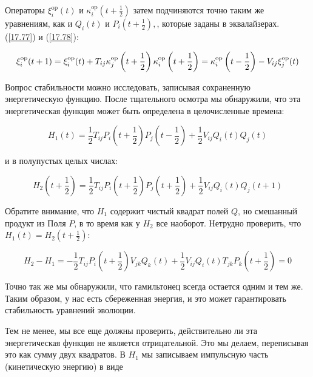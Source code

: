 \documentclass[main.tex]{subfiles}
\begin{document}
Операторы $\xi_{i}^{\mathrm{op}}(t)$ и $\kappa_{i}^{\mathrm{op}}\left(t+\frac{1}{2}\right)$ затем подчиняются точно таким же уравнениям, как и $Q_{i}(t)$ и $P_{i}\left(t+\frac{1}{2}\right),$, которые заданы в эквалайзерах. (\ref{17.77}) и (\ref{17.78}):

\begin{equation}\label{17.83}
\xi_{i}^{\mathrm{op}}(t+1)=\xi_{i}^{\mathrm{op}}(t)+T_{i j} \kappa_{j}^{\mathrm{op}}\left(t+\frac{1}{2}\right)\\
\kappa_{i}^{\mathrm{op}}\left(t+\frac{1}{2}\right)=\kappa_{i}^{\mathrm{op}}\left(t-\frac{1}{2}\right)-V_{i j} \xi_{j}^{\mathrm{op}}(t)
\end{equation}

Вопрос стабильности можно исследовать, записывая сохраненную энергетическую функцию. После тщательного осмотра мы обнаружили, что эта энергетическая функция может быть определена в целочисленные времена:

\begin{equation}\label{17.84}
H_{1}(t)=\frac{1}{2} T_{i j} P_{i}\left(t+\frac{1}{2}\right) P_{j}\left(t-\frac{1}{2}\right)+\frac{1}{2} V_{i j} Q_{i}(t) Q_{j}(t)
\end{equation}

и в полупустых целых числах:

\begin{equation}\label{17.85}
H_{2}\left(t+\frac{1}{2}\right)=\frac{1}{2} T_{i j} P_{i}\left(t+\frac{1}{2}\right) P_{j}\left(t+\frac{1}{2}\right)+\frac{1}{2} V_{i j} Q_{i}(t) Q_{j}(t+1)
\end{equation}

Обратите внимание, что $H_{1}$ содержит чистый квадрат полей $Q$, но смешанный продукт из
Поля $P$, в то время как у $H_{2}$ все наоборот. Нетрудно проверить, что $H_{1}(t)=H_{2}\left(t+\frac{1}{2}\right):$

\begin{equation}\label{17.86}
H_{2}-H_{1}=-\frac{1}{2} T_{i j} P_{i}\left(t+\frac{1}{2}\right) V_{j k} Q_{k}(t)+\frac{1}{2} V_{i j} Q_{i}(t) T_{j k} P_{k}\left(t+\frac{1}{2}\right)=0
\end{equation}

Точно так же мы обнаружили, что гамильтонец всегда остается одним и тем же. Таким образом, у нас есть сбереженная энергия, и это может гарантировать стабильность уравнений эволюции.

Тем не менее, мы все еще должны проверить, действительно ли эта энергетическая функция не является отрицательной. Это мы делаем, переписывая это как сумму двух квадратов. В $H_1$ мы записываем импульсную часть (кинетическую энергию) в виде
\end{document}
